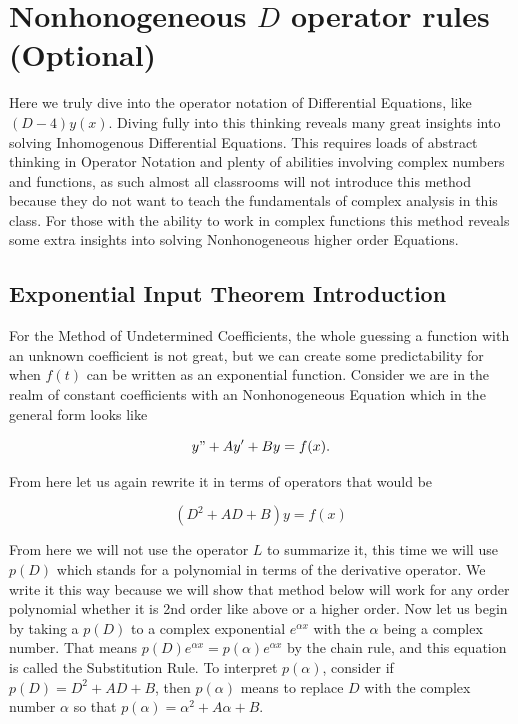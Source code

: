 \documentclass[12pt]{article}
\begin{document}
\pagebreak

\section{Nonhonogeneous $D$ operator rules (Optional)}

Here we truly dive into the operator notation of Differential Equations, like $(D-4)y(x)$. Diving fully into this thinking reveals many great insights into solving Inhomogenous Differential Equations. This requires loads of abstract thinking in Operator Notation and plenty of abilities involving complex numbers and functions, as such almost all classrooms will not introduce this method because they do not want to teach the fundamentals of complex analysis in this class. For those with the ability to work in complex functions this method reveals some extra insights into solving Nonhonogeneous higher order Equations.

\subsection{Exponential Input Theorem Introduction}

For the Method of Undetermined Coefficients, the whole guessing a function with an unknown coefficient is not great, but we can create some predictability for when $f(t)$ can be written as an exponential function. Consider we are in the realm of constant coefficients with an Nonhonogeneous Equation which in the general form looks like

\begin{equation*}
    y"+Ay'+By=f(x).
\end{equation*}

From here let us again rewrite it in terms of operators that would be

\begin{equation*}
    (D^2+AD+B)y=f(x)
\end{equation*}

From here we will not use the operator $L$ to summarize it, this time we will use $p(D)$ which stands for a polynomial in terms of the derivative operator. We write it this way because we will show that method below will work for any order polynomial whether it is 2nd order like above or a higher order. Now let us begin by taking a $p(D)$ to a complex exponential $e^{\alpha x}$ with the $\alpha$ being a complex number. That means $p(D)e^{\alpha x} = p(\alpha)e^{\alpha x}$ by the chain rule, and this equation is called the Substitution Rule. To interpret $p(\alpha)$, consider if $p(D)=D^2+AD+B$, then $p(\alpha)$ means to replace $D$ with the complex number $\alpha$ so that $p(\alpha)=\alpha^2+A\alpha+B$. \\
\end{document}
